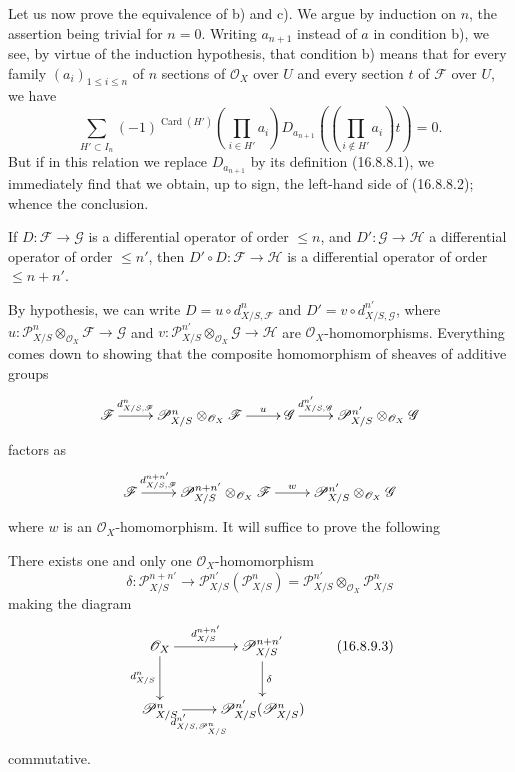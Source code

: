 Let us now prove the equivalence of b) and c). We argue by induction on
$n$, the assertion being trivial for $n=0$. Writing $a_{n+1}$ instead of $a$
in condition b), we see, by virtue of the induction hypothesis, that
condition b) means that for every family $(a_i)_{1\leq i\leq n}$ of $n$
sections of $\mathcal{O}_X$ over $U$ and every section $t$ of
$\mathscr{F}$ over $U$, we have
\[
  \sum_{H'\subset I_n}(-1)^{\operatorname{Card}(H')}
  \left(\prod_{i\in H'}a_i\right)
  D_{a_{n+1}}\!\left(\left(\prod_{i\notin H'}a_i\right)t\right)=0.
\]
But if in this relation we replace $D_{a_{n+1}}$ by its definition
(16.8.8.1), we immediately find that we obtain, up to sign, the left-hand
side of (16.8.8.2); whence the conclusion.

\begin{proposition}[16.8.9]
\label{IV.16.8.9}
If $D:\mathscr{F}\to\mathscr{G}$ is a differential operator of order
$\leq n$, and $D':\mathscr{G}\to\mathscr{H}$ a differential operator of order
$\leq n'$, then $D'\circ D:\mathscr{F}\to\mathscr{H}$ is a differential
operator of order $\leq n+n'$.
\end{proposition}

By hypothesis, we can write $D=u\circ d_{X/S,\mathscr{F}}^n$ and
$D'=v\circ d_{X/S,\mathscr{G}}^{n'}$, where
$u:\mathscr{P}_{X/S}^n\otimes_{\mathcal{O}_X}\mathscr{F}\to\mathscr{G}$ and
$v:\mathscr{P}_{X/S}^{n'}\otimes_{\mathcal{O}_X}\mathscr{G}\to\mathscr{H}$
are $\mathcal{O}_X$-homomorphisms. Everything comes down to showing that
the composite homomorphism of sheaves of additive groups
\[
  \xymatrix{
    \mathscr{F}\ar[r]^-{d_{X/S,\mathscr{F}}^n}
      &\mathscr{P}_{X/S}^n\otimes_{\mathcal{O}_X}\mathscr{F}
        \ar[r]^-u
      &\mathscr{G}\ar[r]^-{d_{X/S,\mathscr{G}}^{n'}}
      &\mathscr{P}_{X/S}^{n'}\otimes_{\mathcal{O}_X}\mathscr{G}
  }
\]
factors as
\[
  \xymatrix{
    \mathscr{F}\ar[r]^-{d_{X/S,\mathscr{F}}^{n+n'}}
      &\mathscr{P}_{X/S}^{n+n'}\otimes_{\mathcal{O}_X}\mathscr{F}
        \ar[r]^-w
      &\mathscr{P}_{X/S}^{n'}\otimes_{\mathcal{O}_X}\mathscr{G}
  }
\]
where $w$ is an $\mathcal{O}_X$-homomorphism. It will suffice to prove the
following

\begin{lemma}[16.8.9.1]
\label{IV.16.8.9.1}
There exists one and only one $\mathcal{O}_X$-homomorphism
\[
  \delta:\mathscr{P}_{X/S}^{n+n'}
  \longrightarrow
  \mathscr{P}_{X/S}^{n'}(\mathscr{P}_{X/S}^n)
  =\mathscr{P}_{X/S}^{n'}\otimes_{\mathcal{O}_X}\mathscr{P}_{X/S}^n
  \tag{16.8.9.2}
  \label{IV.16.8.9.2}
\]
making the diagram
\[
  \xymatrix{
    \mathcal{O}_X\ar[r]^-{d_{X/S}^{n+n'}}\ar[d]_-{d_{X/S}^n}
      &\mathscr{P}_{X/S}^{n+n'}\ar[d]^-\delta\\
    \mathscr{P}_{X/S}^n
      \ar[r]_-{d_{X/S,\mathscr{P}_{X/S}^n}^{n'}}
      &\mathscr{P}_{X/S}^{n'}(\mathscr{P}_{X/S}^n)
  }
  \tag{16.8.9.3}
  \label{IV.16.8.9.3}
\]
commutative.
\end{lemma}

